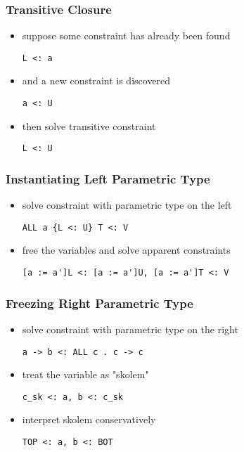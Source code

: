 \documentclass{beamer}
\begin{document}
\begin{frame}[fragile]
  \frametitle{Transitive Closure}

  \begin{itemize}
  \item suppose some constraint has already been found 
  \begin{lstlisting}
L <: a
  \end{lstlisting}
  \item and a new constraint is discovered 
  \begin{lstlisting}
a <: U 
  \end{lstlisting}
  \item then solve transitive constraint  
  \begin{lstlisting}
L <: U
  \end{lstlisting}
  \end{itemize}
\end{frame}

\begin{frame}[fragile]
  \frametitle{Instantiating Left Parametric Type}

  \begin{itemize}
  \item solve constraint with parametric type on the left 
  \begin{lstlisting}
ALL a {L <: U} T <: V
  \end{lstlisting}
  \item free the variables and solve apparent constraints 
  \begin{lstlisting}
[a := a']L <: [a := a']U, [a := a']T <: V 
  \end{lstlisting}
  \end{itemize}
\end{frame}


\begin{frame}[fragile]
  \frametitle{Freezing Right Parametric Type}

  \begin{itemize}
  \item solve constraint with parametric type on the right 
  \begin{lstlisting}
a -> b <: ALL c . c -> c  
  \end{lstlisting}
  \item treat the variable as "skolem" 
  \begin{lstlisting}
c_sk <: a, b <: c_sk  
  \end{lstlisting}
  \item interpret skolem conservatively 
  \begin{lstlisting}
TOP <: a, b <: BOT  
  \end{lstlisting}
  \end{itemize}
\end{frame}
\end{document}
